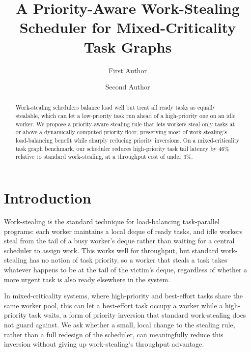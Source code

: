 \documentclass[runningheads]{llncs}
\begin{document}
\title{A Priority-Aware Work-Stealing Scheduler for Mixed-Criticality Task Graphs}

\author{First Author \and
Second Author}



\maketitle

\begin{abstract}
Work-stealing schedulers balance load well but treat all ready tasks as equally stealable, which can let a low-priority task run ahead of a high-priority one on an idle worker. We propose a priority-aware stealing rule that lets workers steal only tasks at or above a dynamically computed priority floor, preserving most of work-stealing's load-balancing benefit while sharply reducing priority inversions. On a mixed-criticality task graph benchmark, our scheduler reduces high-priority task tail latency by 46\% relative to standard work-stealing, at a throughput cost of under 3\%.
\end{abstract}

\section{Introduction}
Work-stealing is the standard technique for load-balancing task-parallel programs: each worker maintains a local deque of ready tasks, and idle workers steal from the tail of a busy worker's deque rather than waiting for a central scheduler to assign work. This works well for throughput, but standard work-stealing has no notion of task priority, so a worker that steals a task takes whatever happens to be at the tail of the victim's deque, regardless of whether a more urgent task is also ready elsewhere in the system.

In mixed-criticality systems, where high-priority and best-effort tasks share the same worker pool, this can let a best-effort task occupy a worker while a high-priority task waits, a form of priority inversion that standard work-stealing does not guard against. We ask whether a small, local change to the stealing rule, rather than a full redesign of the scheduler, can meaningfully reduce this inversion without giving up work-stealing's throughput advantage.
\end{document}
